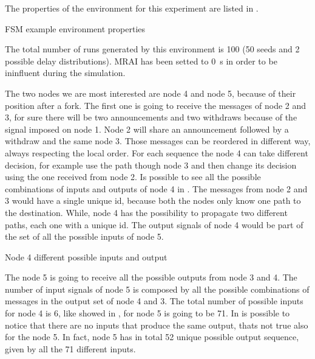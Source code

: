 The properties of the environment for this experiment are listed in .

\begin{table}[h]
	
	\caption{FSM example environment properties}
	\label{tbl:fig_4_example}
\end{table}

The total number of runs generated by this environment is \num{100} (\num{50} seeds
and \num{2} possible delay distributions).
\ac{MRAI} has been setted to \SI{0}{\second} in order to be ininfluent
during the simulation.

The two nodes we are most interested are node \num{4} and node \num{5}, because of their
position after a fork.
The first one is going to receive the messages of node \num{2} and \num{3}, for
sure there will be two announcements and two withdraws because of the signal
imposed on node 1.
Node \num{2} will share an announcement followed by a withdraw and the same node
\num{3}.
Those messages can be reordered in different way, always respecting the local
order.
For each sequence the node \num{4} can take different decision, for
example use the path though node \num{3} and then change its decision using the
one received from node \num{2}.
Is possible to see all the possible combinations of inputs and outputs of node
\num{4} in .
The messages from node \num{2} and \num{3} would have a single unique id, because
both the nodes only know one path to the destination.
While, node \num{4} has the possibility to propagate two different paths, each
one with a unique id.
The output signals of node \num{4} would be part of the set of all the possible
inputs of node \num{5}.

\begin{table}[h]
	
	\caption{Node 4 different possible inputs and output}
	\label{tbl:fig_4_node4_possible_inputs}
\end{table}

The node \num{5} is going to receive all the possible outputs from node \num{3} and
\num{4}.
The number of input signals of node \num{5} is composed by all the possible
combinations of messages in the output set of node \num{4} and \num{3}.
The total number of possible inputs for node \num{4} is \num{6}, like
showed in , for node \num{5} is going
to be \num{71}.
In  is possible to notice that
there are no inputs that produce the same output, thats not true also for
the node \num{5}.
In fact, node \num{5} has in total \num{52} unique possible output sequence,
given by all the \num{71} different inputs.

